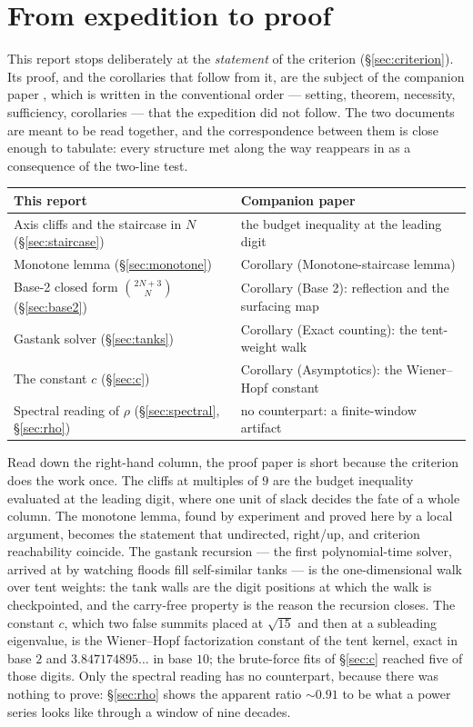 \documentclass[11pt]{article}
\theoremstyle{definition}
\theoremstyle{remark}
\begin{document}
\section{From expedition to proof}\label{sec:outlook}

This report stops deliberately at the \emph{statement} of the criterion
(\S\ref{sec:criterion}). Its proof, and the corollaries that follow from it,
are the subject of the companion paper \cite{criterion}, which is written in the
conventional order --- setting, theorem, necessity, sufficiency, corollaries ---
that the expedition did not follow. The two documents are meant to be read
together, and the correspondence between them is close enough to tabulate:
every structure met along the way reappears in \cite{criterion} as a
consequence of the two-line test.

\begin{center}
\begin{tabular}{@{}ll@{}}
\toprule
This report & Companion paper \cite{criterion} \\
\midrule
Axis cliffs and the staircase in $N$ (\S\ref{sec:staircase})
  & the budget inequality at the leading digit \\
Monotone lemma (\S\ref{sec:monotone})
  & Corollary (Monotone-staircase lemma) \\
Base-2 closed form $\binom{2N+3}{N}$ (\S\ref{sec:base2})
  & Corollary (Base 2): reflection and the surfacing map \\
Gastank solver (\S\ref{sec:tanks})
  & Corollary (Exact counting): the tent-weight walk \\
The constant $c$ (\S\ref{sec:c})
  & Corollary (Asymptotics): the Wiener--Hopf constant \\
Spectral reading of $\rho$ (\S\ref{sec:spectral}, \S\ref{sec:rho})
  & no counterpart: a finite-window artifact \\
\bottomrule
\end{tabular}
\end{center}

Read down the right-hand column, the proof paper is short because the
criterion does the work once. The cliffs at multiples of $9$ are the budget
inequality evaluated at the leading digit, where one unit of slack decides the
fate of a whole column. The monotone lemma, found by experiment and proved here
by a local argument, becomes the statement that undirected, right/up, and
criterion reachability coincide. The gastank recursion --- the first
polynomial-time solver, arrived at by watching floods fill self-similar tanks
--- is the one-dimensional walk over tent weights: the tank walls are the digit
positions at which the walk is checkpointed, and the carry-free property is the
reason the recursion closes. The constant $c$, which two false summits placed at
$\sqrt{15}$ and then at a subleading eigenvalue, is the Wiener--Hopf
factorization constant of the tent kernel, exact in base $2$ and
$3.847174895\ldots$ in base $10$; the brute-force fits of \S\ref{sec:c} reached
five of those digits. Only the spectral reading has no counterpart, because
there was nothing to prove: \S\ref{sec:rho} shows the apparent ratio ${\sim}0.91$
to be what a power series looks like through a window of nine decades.
\end{document}
